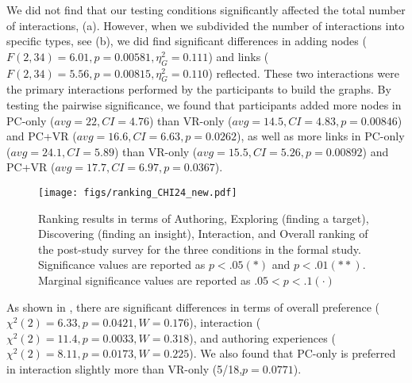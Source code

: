 We did not find that our testing conditions significantly affected the total number of interactions, (a).
However, when we subdivided the number of interactions into specific types, see (b), we did find significant differences in adding nodes ($F(2,34){=}6.01, p{=}0.00581, \eta^2_G{=}0.111$) and links ($F(2,34){=}5.56, p{=}0.00815, \eta^2_G{=}0.110$) reflected.
These two interactions were the primary interactions performed by the participants to build the graphs.
By testing the pairwise significance, we found that participants added more nodes in PC-only ($avg{=}22,CI{=}4.76$) than VR-only ($avg{=}14.5,CI{=}4.83,p{=}0.00846$) and PC+VR ($avg{=}16.6,CI{=}6.63,p{=}0.0262$), as well as more links in PC-only ($avg{=}24.1, CI{=}5.89$) than VR-only ($avg{=}15.5, CI{=}5.26, p{=}0.00892$) and PC+VR ($avg{=}17.7,CI{=}6.97,p{=}0.0367$).


\begin{figure*}
\centering
\texttt{[image: figs/ranking\_CHI24\_new.pdf]}
\caption{Ranking results in terms of Authoring, Exploring (finding a target), Discovering (finding an insight), Interaction, and Overall ranking of the post-study survey for the three conditions in the formal study.
Significance values are reported as $p {<} .05(*)$ and $p {<} .01(**)$.
Marginal significance values are reported as $.05{<}p{<}.1(\cdot)$
}
\label{fig:ranking}
\end{figure*}

As shown in , there are significant differences in terms of overall preference ($\chi^2(2){=}6.33,p{=}0.0421,W{=}0.176$), interaction ($\chi^2(2){=}11.4,p{=}0.0033,W{=}0.318$), and authoring experiences ($\chi^2(2){=}8.11,p{=}0.0173,W{=}0.225$).  We also found that PC-only is preferred in interaction slightly more than VR-only (5/18,$p{=}0.0771$).


